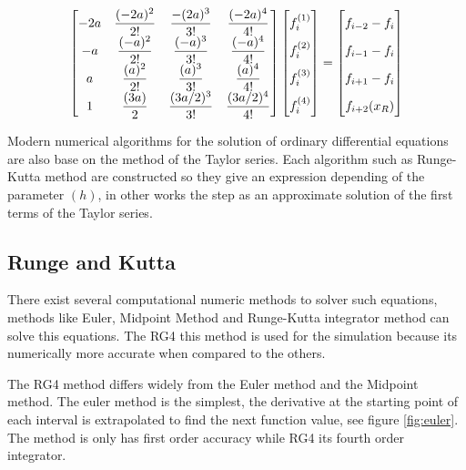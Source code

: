 \begin{align}
\begin{bmatrix}
    -2a & \dfrac{(-2a)^2}{2!} & \dfrac{-(2a)^3}{3!} & \dfrac{(-2a)^4}{4!}\\
    -a & \dfrac{(-a)^2}{2!} & \dfrac{(-a)^3}{3!} & \dfrac{(-a)^4}{4!}\\
    a & \dfrac{(a)^2}{2!} & \dfrac{(a)^3}{3!} & \dfrac{(a)^4}{4!}\\
    1 & \dfrac{(3a)}{2} & \dfrac{(3a/2)^3}{3!} & \dfrac{(3a/2)^4}{4!}
\end{bmatrix}
\begin{bmatrix}
    f_i^{(1)}  \vphantom{ \dfrac{d^4}{d} }\\
    f_i^{(2)}  \vphantom{ \dfrac{d^4}{d} } \\
    f_i^{(3)}  \vphantom{ \dfrac{d^4}{d} } \\
    f_i^{(4)}  \vphantom{ \dfrac{d^4}{d} }
\end{bmatrix}
=
\begin{bmatrix}
    f_{i-2} - f_{i}    \vphantom{ \dfrac{d^4}{d}} \\
    f_{i-1} - f_{i}    \vphantom{ \dfrac{d^4}{d}} \\
    f_{i+1} - f_{i}    \vphantom{ \dfrac{d^4}{d}} \\
    f_{i+2}(x_R)   \vphantom{ \dfrac{d^4}{d}} 
\end{bmatrix}
\end{align}
     

\cite{methods}



Modern numerical algorithms for the solution of ordinary differential equations are also base on the method of the Taylor series. Each algorithm such as Runge-Kutta method are constructed so they give an expression depending of the parameter $(h)$, in other works the step as an approximate solution of the first terms of the Taylor series.

\subsection{Runge and Kutta}

There exist several computational numeric methods to solver such equations, methods like Euler, Midpoint Method and Runge-Kutta integrator method can solve this equations. The RG4 this method is used for the simulation because its numerically more accurate when compared to the others.

The RG4 method differs widely from the Euler method and the Midpoint method. The euler method is the simplest, the derivative at the starting point of each interval is extrapolated to find the next function value, see figure \ref{fig:euler}. The method is only has first order accuracy while RG4 its fourth order integrator.


